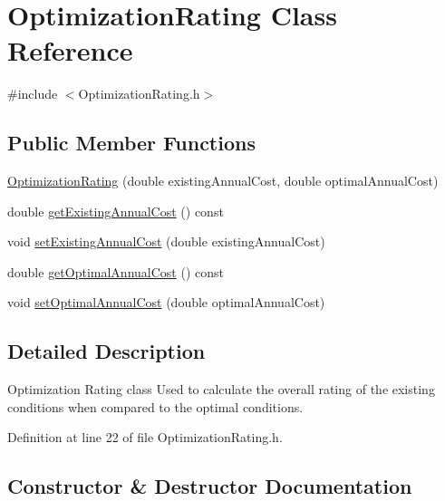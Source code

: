 \hypertarget{class_optimization_rating}{}\section{Optimization\+Rating Class Reference}
\label{class_optimization_rating}


{\ttfamily \#include $<$Optimization\+Rating.\+h$>$}

\subsection*{Public Member Functions}
\begin{DoxyCompactItemize}
\item 
\hyperlink{class_optimization_rating_a775f099775418ff79ae82091f7867c5c}{Optimization\+Rating} (double existing\+Annual\+Cost, double optimal\+Annual\+Cost)
\item 
double \hyperlink{class_optimization_rating_ac6e84aa94642911d089e464aae749ffe}{get\+Existing\+Annual\+Cost} () const
\item 
void \hyperlink{class_optimization_rating_a167d4626ab234baf7facce5fe8e4b32d}{set\+Existing\+Annual\+Cost} (double existing\+Annual\+Cost)
\item 
double \hyperlink{class_optimization_rating_ada9718f5369be2b14b4b0c07d4fa9510}{get\+Optimal\+Annual\+Cost} () const
\item 
void \hyperlink{class_optimization_rating_a4651985a899b2bff18e8356a42c2d37f}{set\+Optimal\+Annual\+Cost} (double optimal\+Annual\+Cost)
\end{DoxyCompactItemize}


\subsection{Detailed Description}
Optimization Rating class Used to calculate the overall rating of the existing conditions when compared to the optimal conditions. 

Definition at line 22 of file Optimization\+Rating.\+h.



\subsection{Constructor \& Destructor Documentation}
\mbox{\label{class_optimization_rating_a775f099775418ff79ae82091f7867c5c}} 
